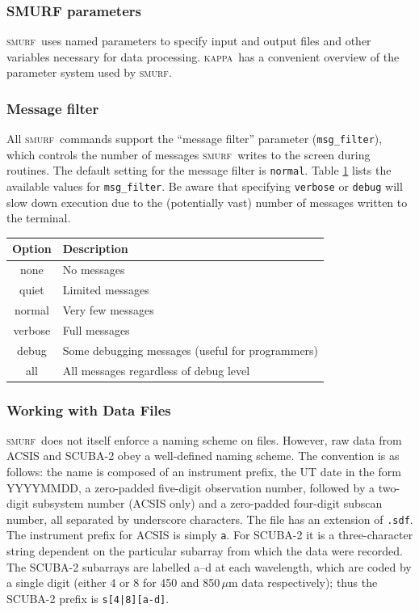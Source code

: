 \documentclass[twoside,11pt]{article}
\newcommand{\xref}[3]{#1}
\newcommand{\xlabel}[1]{}
\renewcommand{\_}{\texttt{\symbol{95}}}
\newcommand{\KAPPA}{\textsc{kappa}}
\newcommand{\KAPPAref}{\xref{\KAPPA}{sun95}{}}
\newcommand{\SMURF}{\textsc{smurf}}
\begin{document}
\subsubsection{SMURF parameters}

\SMURF\ uses named parameters to specify input and output files and
other variables necessary for data processing. \KAPPAref\ has a
convenient overview of the parameter system used by \SMURF.

\subsubsection{Message filter}

All \SMURF\ commands support the ``message filter'' parameter
(\verb+msg_filter+), which controls the number of messages \SMURF\
writes to the screen during routines. The default setting for the
message filter is \verb+normal+. Table \ref{tab:msgfilter}  lists the available
values for \verb+msg_filter+. Be aware that specifying \verb+verbose+
or \verb+debug+ will slow down execution due to the (potentially vast)
number of messages written to the terminal.

\begin{table}
\centering
\begin{tabular}{|c|l|}
\hline
Option  & Description \\
\hline
none   & No messages \\
quiet   & Limited messages \\
normal  & Very few messages \\
verbose & Full messages \\
debug   & Some debugging messages (useful for programmers) \\
all & All messages regardless of debug level \\
\hline
\end{tabular}
\label{tab:msgfilter}
\end{table}

\subsubsection{\xlabel{files}Working with Data Files\label{se:files}}

\SMURF\ does not itself enforce a naming scheme on files. However, raw
data from ACSIS and SCUBA-2 obey a well-defined naming scheme. The
convention is as follows: the name is composed of an instrument
prefix, the UT date in the form YYYYMMDD, a zero-padded five-digit
observation number, followed by a two-digit subsystem number (ACSIS
only) and a zero-padded four-digit subscan number, all separated by
underscore characters. The file has an extension of \verb+.sdf+. The
instrument prefix for ACSIS is simply \verb+a+. For SCUBA-2 it is a
three-character string dependent on the particular subarray from which
the data were recorded. The SCUBA-2 subarrays are labelled a--d at
each wavelength, which are coded by a single digit (either 4 or 8 for
450 and 850\,$\mu$m data respectively); thus the SCUBA-2 prefix is
\verb+s[4|8][a-d]+.
\end{document}
